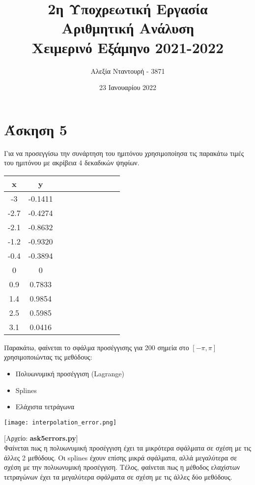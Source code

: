 \documentclass{article}
\title{2η Υποχρεωτική Εργασία \\
Αριθμητική Ανάλυση \\
Χειμερινό Εξάμηνο 2021-2022}
\author{Αλεξία Νταντουρή - 3871}
\date{23 Ιανουαρίου 2022}
\newcommand{\lt}{\latintext}
\newcommand{\gt}{\greektext}
\begin{document}
\maketitle

\section{Άσκηση 5}
Για να προσεγγίσω την συνάρτηση του ημιτόνου χρησιμοποίησα τις παρακάτω τιμές του ημιτόνου με ακρίβεια 4 δεκαδικών ψηφίων.
\lt
\begin{center}
\begin{tabular}{ |c|c|c|c|c|c|c|c|c|c| }
\hline
x & y\\
\hline
-3 & -0.1411\\
-2.7 & -0.4274\\
-2.1 & -0.8632\\
-1.2 & -0.9320\\
-0.4 & -0.3894\\
0 & 0\\
0.9 & 0.7833\\
1.4 & 0.9854\\
2.5 & 0.5985\\
3.1 & 0.0416 \\
\hline
\end{tabular}
\end{center}
\gt
Παρακάτω, φαίνεται το σφάλμα προσέγγισης για 200 σημεία στο $[-\pi,\pi]$ χρησιμοποιώντας τις μεθόδους:
\begin{itemize}
  \item Πολυωνυμική προσέγγιση \lt (Lagrange) \gt
  \item \lt Splines \gt
  \item Ελάχιστα τετράγωνα
\end{itemize}

\begin{center}
\texttt{[image: interpolation\_error.png]}
\end{center}
[Αρχείο: \lt \textbf{ask5errors.py}] \gt \\
Φαίνεται πως η πολυωνυμική προσέγγιση έχει τα μικρότερα σφάλματα σε σχέση με τις άλλες 2 μεθόδους. Οι \lt splines \gt έχουν επίσης μικρά σφάλματα, αλλά μεγαλύτερα σε σχέση με την πολυωνυμική προσέγγιση. Τέλος, φαίνεται πως η μέθοδος ελαχίστων τετραγώνων έχει τα μεγαλύτερα σφάλματα σε σχέση με τις άλλες δύο μεθόδους.
\end{document}
